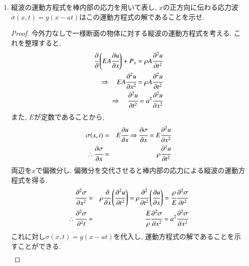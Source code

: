 \documentclass[12pt]{jsarticle}
\newenvironment{solution}
  {\renewcommand\qedsymbol{$\blacksquare$}\begin{proof}[Solution]}
  {\end{proof}}
\begin{document}
\begin{enumerate}
\begin{solution}
\begin{eqnarray*}
\end{eqnarray*}
これを解くことで, 不定積分込みの$\sigma_0(t)$を得る.
\begin{eqnarray*}
\sigma_0(t) = C\exp\left(-\cfrac{\rho aA}{m} t \right)
\end{eqnarray*}
初期条件$V(0)=V_0 \Rightarrow \sigma_0(0) = C = -\rho aV_0$を代入して完全な$\sigma_0(t)$を得る.
\begin{eqnarray*}
\sigma_0(t)=\underline{-\rho aV_0\exp\left(-\cfrac{\rho aA}{m}t \right)}
\end{eqnarray*}
\end{solution}
\item 縦波の運動方程式を棒内部の応力を用いて表し, $x$の正方向に伝わる応力波$\sigma(x, t)=g(x-at)$はこの運動方程式の解であることを示せ.
\begin{proof}
今外力なしで一様断面の物体に対する縦波の運動方程式を考える. これを整理すると,
\begin{eqnarray*}
\cfrac{\partial}{\partial}\left(EA\cfrac{\partial u}{\partial x} \right) + P_x = \rho A \cfrac{\partial^2 u}{\partial t^2} \\
\Rightarrow \quad EA\cfrac{\partial^2 u}{\partial x^2} = \rho A\cfrac{\partial^2 u}{\partial t^2} \\
\Rightarrow \quad \cfrac{\partial^2 u}{\partial t^2}=a^2\cfrac{\partial^2 u}{\partial x^2}
\end{eqnarray*}
また, $E$が定数であることから,
\begin{eqnarray*}
\sigma(x,t) &=& E\cfrac{\partial u}{\partial x}
\Rightarrow \cfrac{\partial \sigma}{\partial x} = E\cfrac{\partial^2 u}{\partial x^2} \\
\therefore \cfrac{\partial \sigma}{\partial x} &=& \rho \cfrac{\partial^2 u}{\partial t^2}
\end{eqnarray*}
両辺を$x$で偏微分し, 偏微分を交代させると棒内部の応力による縦波の運動方程式を得る.
\begin{eqnarray*}
\cfrac{\partial^2 \sigma}{\partial x^2} &=& \rho \cfrac{\partial}{\partial x}\left(\cfrac{\partial^2 u}{\partial t^2} \right) = \rho \cfrac{\partial^2}{\partial t^2}\left(\cfrac{\partial u}{\partial x} \right) = \cfrac{\rho}{E} \cfrac{\partial^2 \sigma}{\partial t^2} \\
\therefore \cfrac{\partial^2 \sigma}{\partial^2 t} &=& \cfrac{E}{\rho}\cfrac{\partial^2 \sigma}{\partial x^2} = a^2\cfrac{\partial^2 \sigma}{\partial x^2}
\end{eqnarray*}
これに対し$\sigma(x, t)=g(x-at)$を代入し, 運動方程式の解であることを示すことができる.
\begin{eqnarray*}

\end{eqnarray*}
\end{proof}
\end{enumerate}
\end{document}

